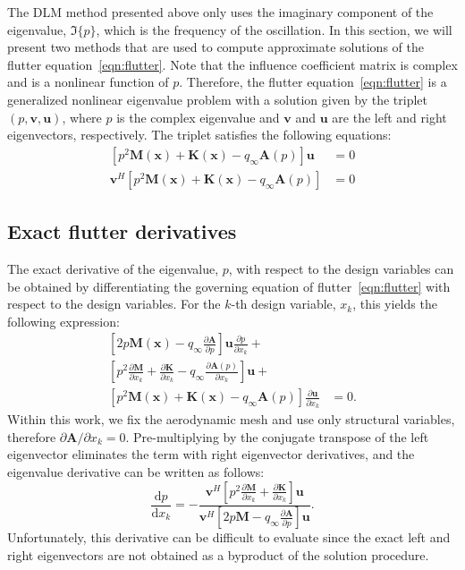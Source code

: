 \documentclass[12pt]{article}
\newcommand{\p}{\partial}
\newcommand{\f}{\frac}
\newcommand{\mb}{\mathbf}
\newcommand{\ds}{\displaystyle}
\begin{document}
The DLM method presented above only uses the imaginary component of
the eigenvalue, $\Im \{ p \}$, which is the frequency of the
oscillation.  In this section, we will present two methods that are
used to compute approximate solutions of the flutter
equation~\eqref{eqn:flutter}.  Note that the influence coefficient
matrix is complex and is a nonlinear function of $p$. Therefore, the
flutter equation~\eqref{eqn:flutter} is a generalized nonlinear
eigenvalue problem with a solution given by the triplet $(p,
\mb{v}, \mb{u})$, where $p$ is the complex eigenvalue and
$\mb{v}$ and $\mb{u}$ are the left and right eigenvectors,
respectively.  The triplet satisfies the following equations:
%
\begin{equation*}
  \begin{aligned}
    \left[ p^2 \mb{M}(\mb{x}) + \mb{K}(\mb{x}) - q_{\infty} \mb{A}(p) \right] \mb{u} & = 0 \\
    \mb{v}^{H} \left[ p^2 \mb{M}(\mb{x}) + \mb{K}(\mb{x}) - q_{\infty} \mb{A}(p) \right] & = 0 
  \end{aligned}
\end{equation*}

\subsection{Exact flutter derivatives}

The exact derivative of the eigenvalue, $p$, with respect to the
design variables can be obtained by differentiating the governing
equation of flutter~\eqref{eqn:flutter} with respect to the design
variables. For the $k$-th design variable, $x_{k}$, this yields the
following expression:
%
\begin{equation*}
  \begin{aligned}
    \left[ 2p \mb{M}(\mb{x}) - q_{\infty} \f{\p \mb{A}}{\p p} \right] \mb{u} \f{\p p}{\p x_{k}} + & \\ 
    \left[ p^2 \f{\p \mb{M}}{\p x_{k}} + \f{\p \mb{K}}{\p x_{k}} - q_{\infty} \f{\p \mb{A}(p)}{\p x_{k}} \right] \mb{u} + & \\
    \left[ p^2 \mb{M}(\mb{x}) + \mb{K}(\mb{x}) - q_{\infty} \mb{A}(p) \right] \f{\p \mb{u}}{\p x_{k}} & = 0.
  \end{aligned}
\end{equation*}
Within this work, we fix the aerodynamic mesh and use only structural
variables, therefore $\p \mb{A}/\p x_{k} = 0$.  Pre-multiplying by the
conjugate transpose of the left eigenvector eliminates the term with
right eigenvector derivatives, and the eigenvalue derivative can be
written as follows:
%
\begin{equation*}
  \f{\mathrm{d} p}{\mathrm{d} x_{k}} = 
  - \f{\ds{\mb{v}^{H} \left[ p^2 \f{\p \mb{M}}{\p x_{k}} + \f{\p \mb{K}}{\p x_{k}} \right] \mb{u}}}{
    \ds{ \mb{v}^{H} \left[ 2p \mb{M} - q_{\infty} \f{\p \mb{A}}{\p p} \right] \mb{u}}}.
\end{equation*}
Unfortunately, this derivative can be difficult to evaluate since the
exact left and right eigenvectors are not obtained as a byproduct of
the solution procedure.
\end{document}
